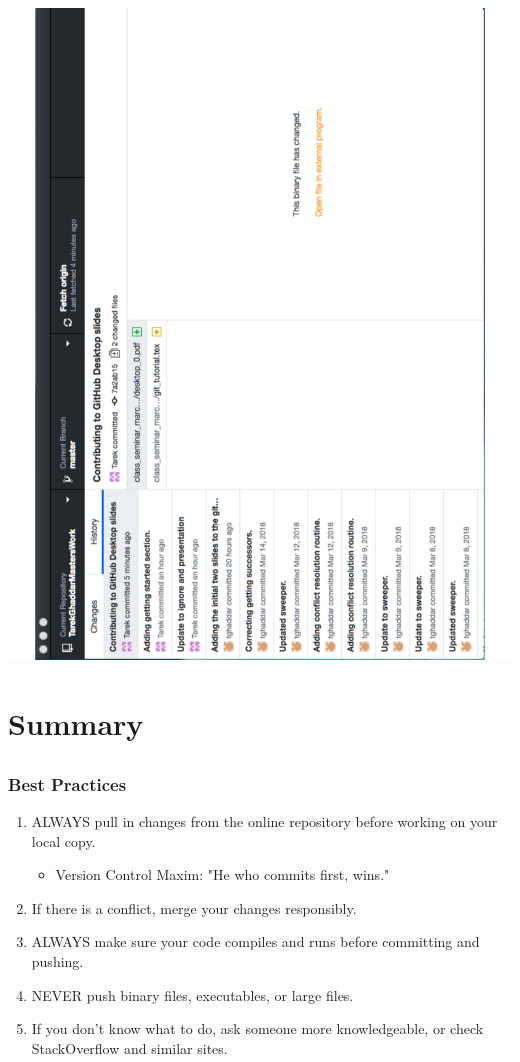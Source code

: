 \documentclass[]{beamer}
\begin{document}
\begin{frame}
\centering
\includegraphics[scale=0.39,angle=-90,origin=c]{figures/desktop_history.pdf}
\end{frame}

\section{Summary}
\subsection{}
\begin{frame}[t]\frametitle{Best Practices}
  \begin{block}{}
    \begin{enumerate}
      \item ALWAYS pull in changes from the online repository before working on your local copy. 
        \begin{itemize}
          \item Version Control Maxim: "He who commits first, wins."
        \end{itemize}
      \item If there is a conflict, merge your changes responsibly.
      \item ALWAYS make sure your code compiles and runs before committing and pushing.
      \item NEVER push binary files, executables, or large files. 
      \item If you don't know what to do, ask someone more knowledgeable, or check StackOverflow and similar sites.
    \end{enumerate}
  \end{block}
\end{frame}
\end{document}
